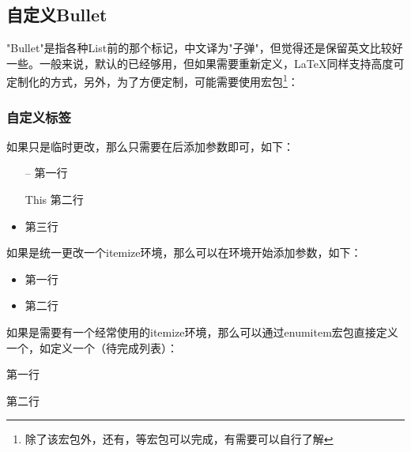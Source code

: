     \subsection{自定义Bullet}
    "Bullet"是指各种List前的那个标记，中文译为"子弹"，但觉得还是保留英文比较好一些。一般来说，默认的已经够用，但如果需要重新定义，\LaTeX{}同样支持高度可定制化的方式，另外，为了方便定制，可能需要使用宏包\footnote{除了该宏包外，还有，等宏包可以完成，有需要可以自行了解}：
    \subsubsection{自定义标签}
    如果只是临时更改，那么只需要在后添加参数即可，如下：
    \begin{texshow}
        \begin{itemize}
            \item[--] 第一行
            \item[This] 第二行 %
            \item 第三行 
        \end{itemize}
    \end{texshow}

    如果是统一更改一个itemize环境，那么可以在环境开始添加参数，如下：
    \begin{texshow}
        \begin{itemize}[label=--]
            \item 第一行
            \item 第二行
        \end{itemize}
    \end{texshow}

    如果是需要有一个经常使用的itemize环境，那么可以通过enumitem宏包直接定义一个，如定义一个（待完成列表）：
    \begin{texshow}
        
        \begin{todolist}
            \item 第一行
            \item 第二行
        \end{todolist}
    \end{texshow}

